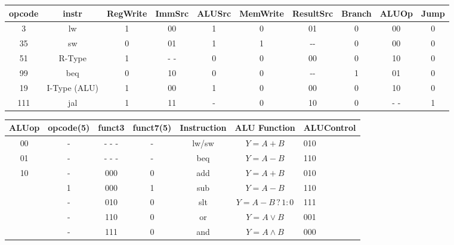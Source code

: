 \documentclass[english]{scrartcl}
\providecommand{\tabularnewline}{\\}
\begin{document}
\begin{center}
\begin{tabular}{|c|c||c|c|c|c|c|c|c|c|}
\hline 
{opcode} & {instr} & {RegWrite} & {ImmSrc} & {ALUSrc} & {MemWrite} & {ResultSrc} & {Branch} & {ALUOp} & {Jump}\tabularnewline
\hline 
\hline 
{3} & {lw} & {1} & {00} & {1} & {0} & {01} & {0} & {00} & {0}\tabularnewline
\hline 
{35} & {sw} & {0} & {01} & {1} & {1} & {-{}-} & {0} & {00} & {0}\tabularnewline
\hline 
{51} & {R-Type} & {1} & {- -} & {0} & {0} & {00} & {0} & {10} & {0}\tabularnewline
\hline 
{99} & {beq} & {0} & {10} & {0} & {0} & {-{}-} & {1} & {01} & {0}\tabularnewline
\hline 
{19} & {I-Type (ALU)} & {1} & {00} & {1} & {0} & {00} & {0} & {10} & {0}\tabularnewline
\hline 
{111} & {jal} & {1} & {11} & {-} & {0} & {10} & {0} & {- -} & {1}\tabularnewline
\hline 
\end{tabular}
\par\end{center}

\newpage{}
\begin{center}
\begin{tabular}{|c|c|c|c|c|c||l|}
\hline 
{ALUop} & {opcode(5)} & {funct3} & {funct7(5)} & {Instruction} & {ALU Function} & {ALUControl}\tabularnewline
\hline 
\hline 
{00} & {-} & {- - -} & {-} & {lw/sw} & {$Y=A+B$} & {010}\tabularnewline
\hline 
{01} & {-} & {- - -} & {-} & {beq} & {$Y=A-B$} & {110 }\tabularnewline
\hline 
\multirow{5}{*}{{10}} & {-} & {000} & {0} & {add} & {$Y=A+B$} & {010}\tabularnewline
\cline{2-7} 
 & {1} & {000} & {1} & {sub} & {$Y=A-B$} & {110}\tabularnewline
\cline{2-7} 
 & {-} & {010} & {0} & {slt} & {$Y=A-B\,?\,1:0$} & {111 }\tabularnewline
\cline{2-7} 
 & {-} & {110} & {0} & {or} & {$Y=A\vee B$} & {001 }\tabularnewline
\cline{2-7} 
 & {-} & {111} & {0} & {and} & {$Y=A\wedge B$} & {000 }\tabularnewline
\hline 
\end{tabular}
\par\end{center}
\end{document}
